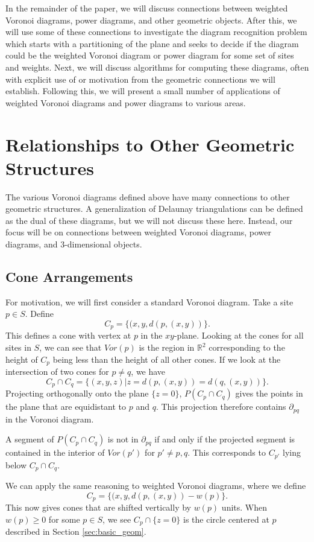 \documentclass[a4paper, 11pt]{article}
\newcommand{\R}{\mathbb{R}}
\begin{document}
In the remainder of the paper, we will discuss connections between weighted Voronoi diagrams, power diagrams, and other geometric objects. After this,
we will use some of these connections to investigate the diagram recognition problem which starts with a partitioning of the plane and seeks to decide if the diagram could be the
weighted Voronoi diagram or power diagram for some set of sites and weights. Next, we will discuss algorithms for computing these diagrams, often with
explicit use of or motivation from the geometric connections we will establish. Following this, we will present a small number of applications of
weighted Voronoi diagrams and power diagrams to various areas.

\section{Relationships to Other Geometric Structures}
\label{sec:geom_rel}
The various Voronoi diagrams defined above have many connections to other geometric structures. A generalization of Delaunay triangulations can be
defined as the dual of these diagrams, but we will not discuss these here. Instead, our focus will be on connections between weighted Voronoi
diagrams, power diagrams, and 3-dimensional objects.

\subsection{Cone Arrangements}
\label{sec:cone}
For motivation, we will first consider a standard Voronoi diagram. Take a site $p \in S$. Define
\[ C_p = \{ (x, y, d(p, (x,y)) \}. \]
This defines a cone with vertex at $p$ in the $xy$-plane. Looking at the cones for all sites in $S$, we can see that $Vor(p)$ is the region in $\R^2$ corresponding to the height of $C_p$ being
less than the height of all other cones. If we look at the intersection of two cones for $p \neq q$, we have
\[ C_p \cap C_{q} = \{ (x,y,z) | z = d(p, (x,y)) = d(q, (x,y)) \}. \]
Projecting orthogonally onto the plane $\{z = 0\}$, $P(C_p \cap C_{q})$ gives the points in the plane that are equidistant to $p$ and $q$. This projection therefore contains
$\partial_{pq}$ in the Voronoi diagram.

A segment of $P( C_p \cap C_q)$ is not in $\partial_{pq}$ if and only if the projected segment is contained in the interior of $Vor(p')$ for $p'
\neq p, q$. This corresponds to $C_{p'}$ lying below $C_p \cap C_q$.

We can apply the same reasoning to weighted Voronoi diagrams, where we define
\[ C_p = \{ (x, y, d(p, (x,y)) - w(p) \}. \]
This now gives cones that are shifted vertically by $w(p)$ units.  When $w(p) \geq 0$ for some $p \in S$, we see $C_p \cap \{ z = 0 \}$ is the circle
centered at $p$ described in Section \ref{sec:basic_geom}.
\end{document}
